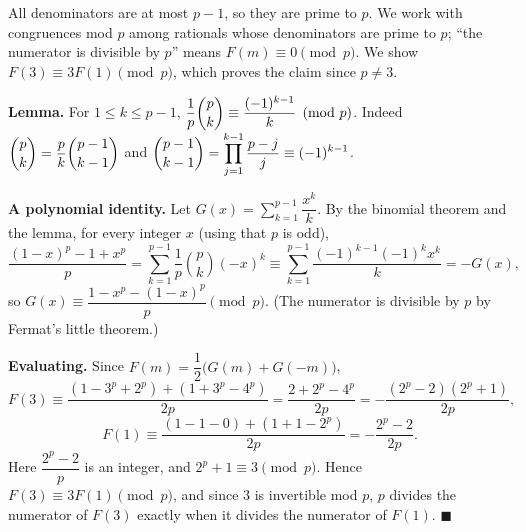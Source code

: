 All denominators are at most $p-1$, so they are prime to $p$. We work with congruences mod $p$ among rationals whose denominators are prime to $p$; ``the numerator is divisible by $p$'' means $F(m)\equiv0\pmod p$. We show $F(3)\equiv3F(1)\pmod p$, which proves the claim since $p\ne3$.

\textbf{Lemma.} For $1\le k\le p-1$, $\dfrac1p\dbinom pk\equiv\dfrac{(-1)^{k-1}}k\pmod p$. Indeed $\dbinom pk=\dfrac pk\dbinom{p-1}{k-1}$ and $\dbinom{p-1}{k-1}=\displaystyle\prod_{j=1}^{k-1}\dfrac{p-j}j\equiv(-1)^{k-1}$.

\textbf{A polynomial identity.} Let $G(x)=\displaystyle\sum_{k=1}^{p-1}\dfrac{x^k}k$. By the binomial theorem and the lemma, for every integer $x$ (using that $p$ is odd),
\[\dfrac{(1-x)^p-1+x^p}p=\sum_{k=1}^{p-1}\dfrac1p\binom pk(-x)^k\equiv\sum_{k=1}^{p-1}\dfrac{(-1)^{k-1}(-1)^k x^k}k=-G(x),\]
so $G(x)\equiv\dfrac{1-x^p-(1-x)^p}p\pmod p$. (The numerator is divisible by $p$ by Fermat's little theorem.)

\textbf{Evaluating.} Since $F(m)=\dfrac12\bigl(G(m)+G(-m)\bigr)$,
\[F(3)\equiv\dfrac{(1-3^p+2^p)+(1+3^p-4^p)}{2p}=\dfrac{2+2^p-4^p}{2p}=-\dfrac{(2^p-2)(2^p+1)}{2p},\]
\[F(1)\equiv\dfrac{(1-1-0)+(1+1-2^p)}{2p}=-\dfrac{2^p-2}{2p}.\]
Here $\dfrac{2^p-2}p$ is an integer, and $2^p+1\equiv3\pmod p$. Hence $F(3)\equiv3F(1)\pmod p$, and since $3$ is invertible mod $p$, $p$ divides the numerator of $F(3)$ exactly when it divides the numerator of $F(1)$. $\blacksquare$
